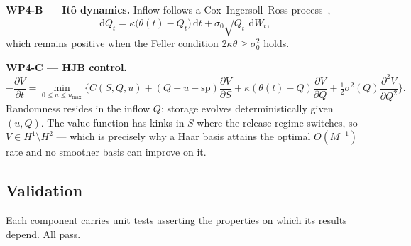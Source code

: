 \documentclass[12pt,a4paper]{article}
\newcommand{\dif}{\,\mathrm{d}}
\begin{document}
\textbf{WP4-B --- Itô dynamics.} Inflow follows a Cox--Ingersoll--Ross
process~\citep{Cox1985},
\begin{equation}
\dif Q_t = \kappa\big(\theta(t) - Q_t\big)\dif t + \sigma_0\sqrt{Q_t}\,\dif W_t,
\end{equation}
which remains positive when the Feller condition $2\kappa\theta \geq \sigma_0^2$
holds.

\textbf{WP4-C --- HJB control.}
\begin{equation}
-\frac{\partial V}{\partial t} = \min_{0 \leq u \leq u_{\max}}
\Big\{ C(S,Q,u) + (Q-u-\mathrm{sp})\frac{\partial V}{\partial S}
+ \kappa(\theta(t)-Q)\frac{\partial V}{\partial Q}
+ \tfrac{1}{2}\sigma^2(Q)\frac{\partial^2 V}{\partial Q^2} \Big\}.
\end{equation}
Randomness resides in the inflow $Q$; storage evolves deterministically given
$(u,Q)$. The value function has kinks in $S$ where the release regime switches,
so $V \in H^1 \setminus H^2$ --- which is precisely why a Haar basis attains the
optimal $O(M^{-1})$ rate and no smoother basis can improve on it.

\subsection{Validation}

Each component carries unit tests asserting the properties on which its results
depend. All pass.
\end{document}

